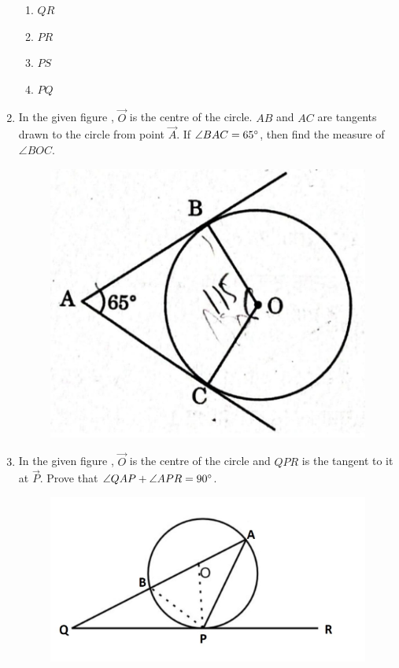 \begin{enumerate}
\begin{figure}[H]
			\caption{}
			\label{fig:circle6}
		\end{figure}
		\begin{enumerate}
			\item $ QR $
			\item $ PR $
			\item $ PS $
			\item $ PQ $
		\end{enumerate}
	\item In the given figure , $ \vec{O} $ is the centre of the circle. $ AB $ and $ AC $ are tangents drawn to the circle from point $ \vec{A} $. If $ \angle{BAC} = 65{\degree} $, then find the measure of $ \angle{BOC} $.
		\begin{figure}[H]
			\centering
			\includegraphics[width=\columnwidth]{figs/circle7.jpg}
			\caption{}
			\label{fig:circle7}
		\end{figure}
	\item In the given figure , $ \vec{O} $ is the centre of the circle and $ QPR $ is the tangent to it at $ \vec{P} $. Prove that $ \angle{QAP} + \angle{APR} = 90{\degree} $.			
		\begin{figure}[H]
			\centering
			\includegraphics[width=\columnwidth]{figs/circle8.jpg}

\end{figure}
\end{enumerate}
